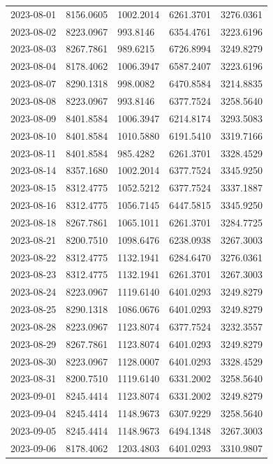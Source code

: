 {\begin{longtable}{lllll}
2023-08-01 & 8156.0605 & 1002.2014 & 6261.3701 & 3276.0361 \\
2023-08-02 & 8223.0967 & 993.8146 & 6354.4761 & 3223.6196 \\
2023-08-03 & 8267.7861 & 989.6215 & 6726.8994 & 3249.8279 \\
2023-08-04 & 8178.4062 & 1006.3947 & 6587.2407 & 3223.6196 \\
2023-08-07 & 8290.1318 & 998.0082 & 6470.8584 & 3214.8835 \\
2023-08-08 & 8223.0967 & 993.8146 & 6377.7524 & 3258.5640 \\
2023-08-09 & 8401.8584 & 1006.3947 & 6214.8174 & 3293.5083 \\
2023-08-10 & 8401.8584 & 1010.5880 & 6191.5410 & 3319.7166 \\
2023-08-11 & 8401.8584 & 985.4282 & 6261.3701 & 3328.4529 \\
2023-08-14 & 8357.1680 & 1002.2014 & 6377.7524 & 3345.9250 \\
2023-08-15 & 8312.4775 & 1052.5212 & 6377.7524 & 3337.1887 \\
2023-08-16 & 8312.4775 & 1056.7145 & 6447.5815 & 3345.9250 \\
2023-08-18 & 8267.7861 & 1065.1011 & 6261.3701 & 3284.7725 \\
2023-08-21 & 8200.7510 & 1098.6476 & 6238.0938 & 3267.3003 \\
2023-08-22 & 8312.4775 & 1132.1941 & 6284.6470 & 3276.0361 \\
2023-08-23 & 8312.4775 & 1132.1941 & 6261.3701 & 3267.3003 \\
2023-08-24 & 8223.0967 & 1119.6140 & 6401.0293 & 3249.8279 \\
2023-08-25 & 8290.1318 & 1086.0676 & 6401.0293 & 3249.8279 \\
2023-08-28 & 8223.0967 & 1123.8074 & 6377.7524 & 3232.3557 \\
2023-08-29 & 8267.7861 & 1123.8074 & 6401.0293 & 3249.8279 \\
2023-08-30 & 8223.0967 & 1128.0007 & 6401.0293 & 3328.4529 \\
2023-08-31 & 8200.7510 & 1119.6140 & 6331.2002 & 3258.5640 \\
2023-09-01 & 8245.4414 & 1123.8074 & 6331.2002 & 3249.8279 \\
2023-09-04 & 8245.4414 & 1148.9673 & 6307.9229 & 3258.5640 \\
2023-09-05 & 8245.4414 & 1148.9673 & 6494.1348 & 3267.3003 \\
2023-09-06 & 8178.4062 & 1203.4803 & 6401.0293 & 3310.9807 \\

\end{longtable}}
